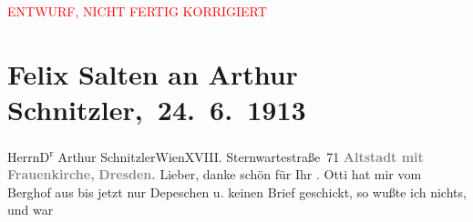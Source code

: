 
\begin{center}
            \textcolor{red}{ENTWURF, NICHT FERTIG KORRIGIERT}
                      \end{center}
            
         
         \renewcommand{\erwaehntePersonen}{Personen: Lili Cappellini, Ottilie Salten, Heinrich Schnitzler, Olga Schnitzler}
         \renewcommand{\erwaehnteOrte}{Orte: Berghof, Dresden, Frauenkirche, Sternwartestraße 71, Wien}
         \renewcommand{\erwaehnteWerke}{}
               \section[ Felix Salten an Arthur Schnitzler, 24. 6. 1913]{ Felix Salten an Arthur Schnitzler, 24. 6. 1913}\nopagebreak{}\rehead{ }\begin{ledgroupsized}[t]{13cm}\normalsize\beginnumbering \toendnotes[C]{\smallbreak\pagebreak[2]} 
\toendnotes[C]{\smallbreak}\pstart{}{\pb}Herrn\pend{}\pstart{}D\textsuperscript{r} Arthur Schnitzler\pend{}\pstart{}Wien\pend{}\pstart{}XVIII. Sternwartestraße 71\pend{}{\bigskip}\pstart
           \noindent{}\centering{}{\pb}\textcolor{gray}{\textbf{Altstadt mit Frauenkirche\textcolor{gray}{,}}}\pend
           \pstart
           \noindent{}\centering{}\textcolor{gray}{\textbf{Dresden.}}\pend
           \pstart{}{\pb}Lieber,\pend\pstart
           danke schön für Ihr \label{K_L03561-1v}\label{K_L03561-1h}. Otti hat mir vom Berghof
               aus bis jetzt nur Depeschen u. keinen Brief geschickt, so wußte ich nichts, und war

\end{ledgroupsized}
